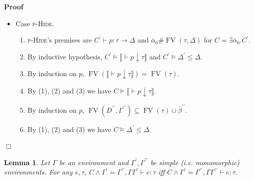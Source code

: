 \documentclass{article}
\newcommand{\tmname}[1]{\textsc{#1}}
\newcommand{\tmop}[1]{\ensuremath{\operatorname{#1}}}
\newenvironment{proof}{\noindent\textbf{Proof\ }}{\hspace*{\fill}$\Box$\medskip}
\newtheorem{lemma}{Lemma}
\begin{document}
\begin{proof}
\begin{itemize}
    \item Case {\tmname{p-Hide}}.
    \begin{enumerate}
      \item {\tmname{p-Hide}}'s premises are $C^{\prime} \vdash p : \tau
      \longrightarrow \Delta$ and $\bar{\alpha}_0 \# \tmop{FV} (\tau, \Delta)$
      for $C = \exists \bar{\alpha}_0 .C^{\prime}$.
      
      \item By inductive hypothesis, $C^{\prime} \vDash \llbracket \vdash p
      \downarrow \tau \rrbracket$ and $C^{\prime} \vDash \Delta^{\prime}
      \leqslant \Delta$.
      
      \item By induction on $p$, $\tmop{FV} (\llbracket \vdash p \downarrow
      \tau \rrbracket) = \tmop{FV} (\tau)$.
      
      \item By (1), (2) and (3) we have $C \vDash \llbracket \vdash p
      \downarrow \tau \rrbracket$.
      
      \item By induction on $p$, $\tmop{FV} (D^{\prime\prime},
      \Gamma^{\prime\prime}) \subseteq \tmop{FV} (\tau) \cup
      \bar{\beta}^{\prime\prime}$.
      
      \item By (1), (2) and (3) we have $C \vDash \Delta^{\prime} \leqslant
      \Delta$.
    \end{enumerate}
  \end{itemize}
\end{proof}

\begin{lemma}
  \label{MonoEnvEq}Let $\Gamma$ be an environment and $\Gamma^{\prime},
  \Gamma^{\prime\prime}$ be simple (i.e. monomorphic) environments. For any
  $e, \tau$, $C \wedge \Gamma^{\prime} \dot{=} \Gamma^{\prime\prime}, \Gamma
  \Gamma^{\prime} \vdash e : \tau$ iff $C \wedge \Gamma^{\prime} \dot{=}
  \Gamma^{\prime\prime}, \Gamma \Gamma^{\prime\prime} \vdash e : \tau$.
\end{lemma}
\end{document}
